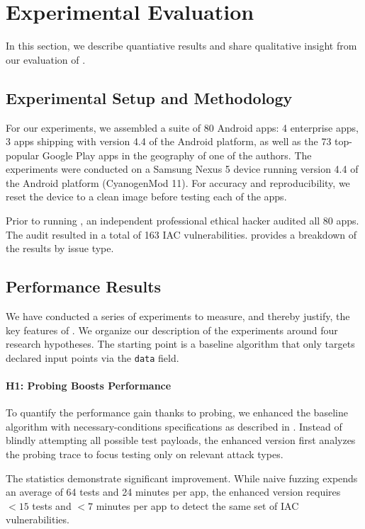 \section{Experimental Evaluation}\label{Se:evaluation}

In this section, we describe quantiative results and share qualitative insight from our evaluation of \Tool. 

\subsection{Experimental Setup and Methodology}

For our experiments, we assembled a suite of 80 Android apps: 4 enterprise apps, 3 apps shipping with version 4.4 of the Android platform, as well as the 73 top-popular Google Play apps in the geography of one of the authors.
The experiments were conducted on a Samsung Nexus 5 device running version 4.4 of the Android platform (CyanogenMod 11). For accuracy and reproducibility, we reset the device to a clean image before testing each of the apps.

Prior to running \Tool, an independent professional ethical hacker audited all 80 apps. The audit resulted in a total of 163 IAC vulnerabilities.  provides a breakdown of the results by issue type.

\subsection{Performance Results}

We have conducted a series of experiments to measure, and thereby justify, the key features of \Tool. We organize our description of the experiments around four research hypotheses. The starting point is a baseline algorithm that only targets declared input points via the {\tt data} field.

\paragraph{H1: Probing Boosts Performance} To quantify the performance gain thanks to probing, we enhanced the baseline algorithm with necessary-conditions specifications as described in . Instead of blindly attempting all possible test payloads, the enhanced version first analyzes the probing trace to focus testing only on relevant attack types.

The statistics demonstrate significant improvement. While naive fuzzing expends an average of 64 tests and 24 minutes per app, the enhanced version requires $<15$ tests and $<7$ minutes per app to detect the same set of IAC vulnerabilities.

